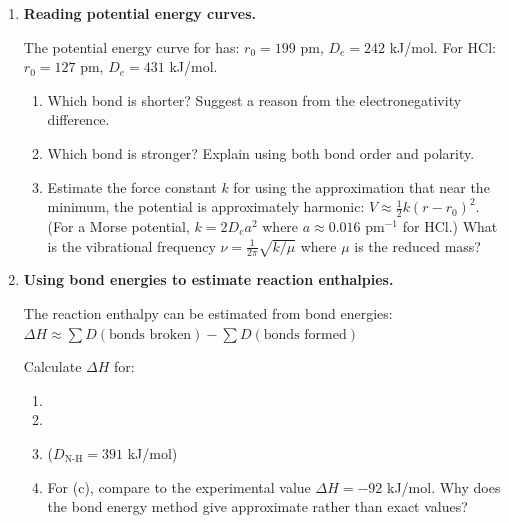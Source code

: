 \documentclass[12pt, a4paper]{book}
\begin{document}
\begin{problembox}
\begin{enumerate}[label=\textbf{\arabic*.}]
  \item \textbf{Reading potential energy curves.}

        The potential energy curve for  has:
        $r_0 = 199$ pm, $D_e = 242$ kJ/mol.
        For HCl: $r_0 = 127$ pm, $D_e = 431$ kJ/mol.

        \begin{enumerate}[label=(\alph*)]
          \item Which bond is shorter? Suggest a reason
                from the electronegativity difference.
          \item Which bond is stronger?
                Explain using both bond order and polarity.
          \item Estimate the force constant $k$ for 
                using the approximation that near the
                minimum, the potential is approximately
                harmonic: $V \approx \frac{1}{2}k(r-r_0)^2$.
                (For a Morse potential,
                $k = 2D_e a^2$ where $a \approx 0.016$ pm$^{-1}$
                for HCl.)
                What is the vibrational frequency
                $\nu = \frac{1}{2\pi}\sqrt{k/\mu}$
                where $\mu$ is the reduced mass?
        \end{enumerate}

  \item \textbf{Using bond energies to estimate reaction enthalpies.}

        The reaction enthalpy can be estimated from
        bond energies:
        $\Delta H \approx \sum D(\text{bonds broken}) -
                          \sum D(\text{bonds formed})$

        Calculate $\Delta H$ for:
        \begin{enumerate}[label=(\alph*)]
          \item {}
          \item {}
          \item {}
                ($D_\text{N-H} = 391$ kJ/mol)
          \item For (c), compare to the experimental value
                $\Delta H = -92$ kJ/mol.
                Why does the bond energy method give
                approximate rather than exact values?
        \end{enumerate}


\end{enumerate}
\end{problembox}
\end{document}
